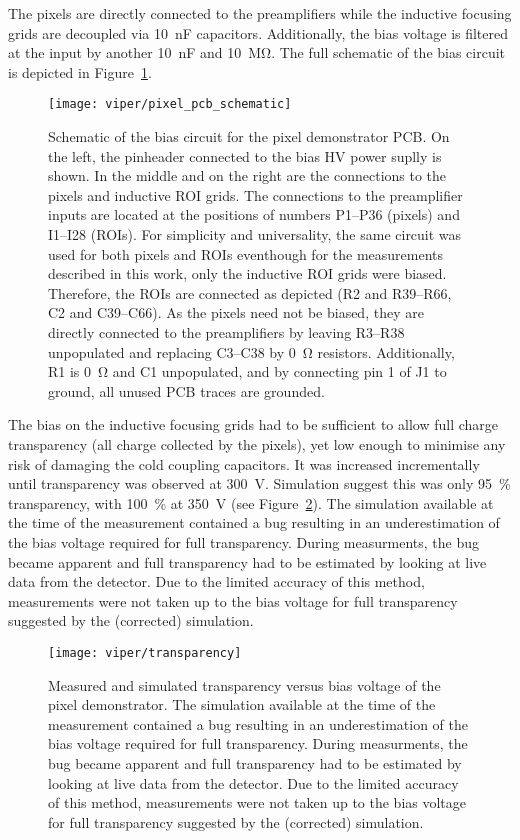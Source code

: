 The pixels are directly connected to the preamplifiers while the inductive focusing grids are decoupled via \SI{10}{\nano\farad} capacitors.
Additionally, the bias voltage is filtered at the input by another \SI{10}{\nano\farad} and \SI{10}{\mega\ohm}.
The full schematic of the bias circuit is depicted in Figure~\ref{fig:viper_pcb_schematic}.

\begin{figure}[htb]
	\centering
	\texttt{[image: viper/pixel\_pcb\_schematic]}
	\caption{Schematic of the bias circuit for the \AC{} pixel demonstrator PCB.
	On the left, the pinheader connected to the bias HV power suplly is shown. In the middle and on the right are the connections to the pixels and inductive ROI grids.
	The connections to the preamplifier inputs are located at the positions of numbers P1--P36 (pixels) and I1--I28 (ROIs).
	For simplicity and universality, the same circuit was used for both pixels and ROIs eventhough for the measurements described in this work, only the inductive ROI grids were biased.
	Therefore, the ROIs are connected as depicted (R2 and R39--R66, C2 and C39--C66).
	As the pixels need not be biased, they are directly connected to the preamplifiers by leaving R3--R38 unpopulated and replacing C3--C38 by \SI{0}{\ohm} resistors.
	Additionally, R1 is \SI{0}{\ohm} and C1 unpopulated, and by connecting pin 1 of J1 to ground, all unused PCB traces are grounded.}
	\label{fig:viper_pcb_schematic}
\end{figure}

The bias on the inductive focusing grids had to be sufficient to allow full charge transparency (all charge collected by the pixels), yet low enough to minimise any risk of damaging the cold coupling capacitors.
It was increased incrementally until transparency was observed at \SI{300}{\volt}. 
Simulation suggest this was only \SI{95}{\percent} transparency, with \SI{100}{\percent} at \SI{350}{\volt} (see Figure~\ref{fig:viper_transparency}).
The simulation available at the time of the measurement contained a bug resulting in an underestimation of the bias voltage required for full transparency.
During measurments, the bug became apparent and full transparency had to be estimated by looking at live data from the detector.
Due to the limited accuracy of this method, measurements were not taken up to the bias voltage for full transparency suggested by the (corrected) simulation.~\cite{francypants}

\begin{figure}[htb]
	\centering
	\texttt{[image: viper/transparency]}
	\caption{Measured and simulated transparency versus bias voltage of the \AC{} pixel demonstrator.
	The simulation available at the time of the measurement contained a bug resulting in an underestimation of the bias voltage required for full transparency.
	During measurments, the bug became apparent and full transparency had to be estimated by looking at live data from the detector.
	Due to the limited accuracy of this method, measurements were not taken up to the bias voltage for full transparency suggested by the (corrected) simulation.~\cite{francypants}}
	\label{fig:viper_transparency}
\end{figure}


